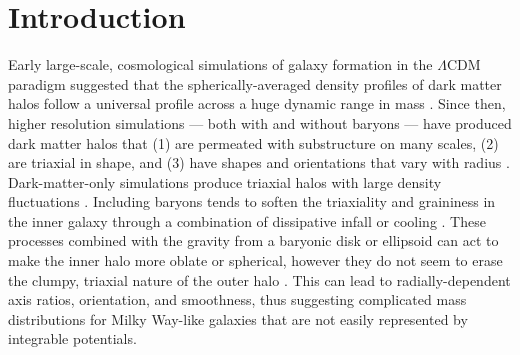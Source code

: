 \documentclass[letterpaper,12pt,preprint]{aastex}
\begin{document}

\section{Introduction}

Early large-scale, cosmological simulations of galaxy formation in the $\Lambda$CDM paradigm suggested that the spherically-averaged density profiles of dark matter halos follow a universal profile across a huge dynamic range in mass \citep{navarro96}. Since then, higher resolution simulations --- both with and without baryons --- have produced dark matter halos that (1) are permeated with substructure on many scales, (2) are triaxial in shape, and (3) have shapes and orientations that vary with radius \citep{dubinski91, jing02, kuhlen07, veraciro11}. Dark-matter-only simulations produce triaxial halos \citep{jing02} with large density fluctuations \citep{zemp09}. Including baryons tends to soften the triaxiality and graininess in the inner galaxy through a combination of dissipative infall \citep{dubinski94} or cooling \citep{bryan13}. These processes combined with the gravity from a baryonic disk or ellipsoid can act to make the inner halo more oblate or spherical, however they do not seem to erase the clumpy, triaxial nature of the outer halo \citep[e.g.,][]{pontzen12}. This can lead to radially-dependent axis ratios, orientation, and smoothness, thus suggesting complicated mass distributions for Milky Way-like galaxies that are not easily represented by integrable potentials.
\end{document}
